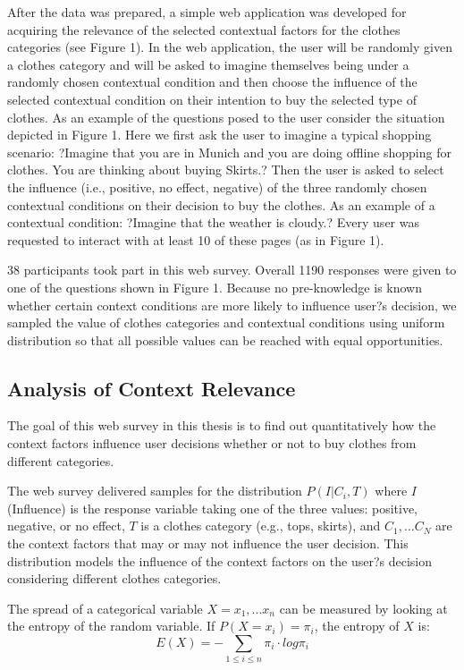After the data was prepared, a simple web application was developed for acquiring the relevance of the selected contextual factors for the clothes categories (see Figure 1). In the web application, the user will be randomly given a clothes category and will be asked to imagine themselves being under a randomly chosen contextual condition and then choose the influence of the selected contextual condition on their intention to buy the selected type of clothes. As an example of the questions posed to the user consider the situation depicted in Figure 1. Here we first ask the user to imagine a typical shopping scenario: ?Imagine that you are in Munich and you are doing offline shopping for clothes. You are thinking about buying Skirts.? Then the user is asked to select the influence (i.e., positive, no effect, negative) of the three randomly chosen contextual conditions on their decision to buy the clothes. As an example of a contextual condition: ?Imagine that the weather is cloudy.? Every user was requested to interact with at least 10 of these pages (as in Figure 1). 

38 participants took part in this web survey. Overall 1190 responses were given to one of the questions shown in Figure 1. Because no pre-knowledge is known whether certain context conditions are more likely to influence user?s decision, we sampled the value of clothes categories and contextual conditions using uniform distribution so that all possible values can be reached with equal opportunities.

\subsection{Analysis of Context Relevance} \label{sec:acr_acr}

The goal of this web survey in this thesis is to find out quantitatively how the context factors influence user decisions whether or not to buy clothes from different categories. 

The web survey delivered samples for the distribution $P(I|C_i,T)$ where $I$(Influence) is the response variable taking one of the three values: positive, negative, or no effect, $T$ is a clothes category (e.g., tops, skirts), and $C_1, ... C_N$ are the context factors that may or may not influence the user decision. This distribution models the influence of the context factors on the user?s decision considering different clothes categories. 

The spread of a categorical variable $X={x_1, ... x_n}$ can be measured by looking at the entropy of the random variable. If $P(X=x_i)=\pi_i$, the entropy of $X$ is: 
$$E(X)=-\sum_{1\leq i\leq n}\pi_i \cdot log{\pi_i} $$

